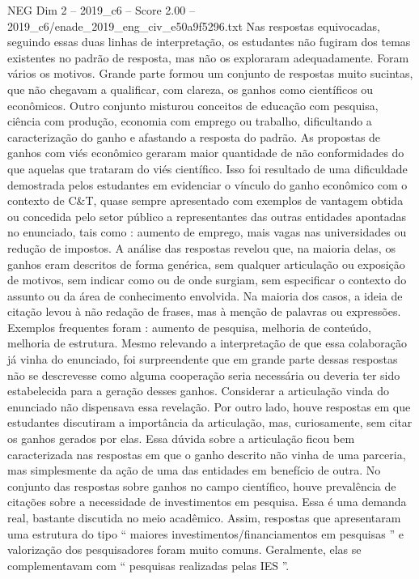 \begin{textsample}{NEG Dim 2 – 2019\_c6 – Score 2.00 – 2019\_c6/enade\_2019\_eng\_civ\_e50a9f5296.txt}
Nas respostas equivocadas, seguindo essas duas linhas de interpretação, os estudantes não fugiram dos temas existentes no padrão de resposta, mas não os exploraram adequadamente.
Foram vários os motivos.
Grande parte formou um conjunto de respostas muito sucintas, que não chegavam a qualificar, com clareza, os ganhos como científicos ou econômicos.
Outro conjunto misturou conceitos de educação com pesquisa, ciência com produção, economia com emprego ou trabalho, dificultando a caracterização do ganho e afastando a resposta do padrão.
As propostas de ganhos com viés econômico geraram maior quantidade de não conformidades do que aquelas que trataram do viés científico.
Isso foi resultado de uma dificuldade demostrada pelos estudantes em evidenciar o vínculo do ganho econômico com o contexto de C\&T, quase sempre apresentado com exemplos de vantagem obtida ou concedida pelo setor público a representantes das outras entidades apontadas no enunciado, tais como : aumento de emprego, mais vagas nas universidades ou redução de impostos.
A análise das respostas revelou que, na maioria delas, os ganhos eram descritos de forma genérica, sem qualquer articulação ou exposição de motivos, sem indicar como ou de onde surgiam, sem especificar o contexto do assunto ou da área de conhecimento envolvida.
Na maioria dos casos, a ideia de citação levou à não redação de frases, mas à menção de palavras ou expressões.
Exemplos frequentes foram : aumento de pesquisa, melhoria de conteúdo, melhoria de estrutura.
Mesmo relevando a interpretação de que essa colaboração já vinha do enunciado, foi surpreendente que em grande parte dessas respostas não se descrevesse como alguma cooperação seria necessária ou deveria ter sido estabelecida para a geração desses ganhos.
Considerar a articulação vinda do enunciado não dispensava essa revelação.
Por outro lado, houve respostas em que estudantes discutiram a importância da articulação, mas, curiosamente, sem citar os ganhos gerados por elas.
Essa dúvida sobre a articulação ficou bem caracterizada nas respostas em que o ganho descrito não vinha de uma parceria, mas simplesmente da ação de uma das entidades em benefício de outra.
No conjunto das respostas sobre ganhos no campo científico, houve prevalência de citações sobre a necessidade de investimentos em pesquisa.
Essa é uma demanda real, bastante discutida no meio acadêmico.
Assim, respostas que apresentaram uma estrutura do tipo “ maiores investimentos/financiamentos em pesquisas ” e valorização dos pesquisadores foram muito comuns.
Geralmente, elas se complementavam com “ pesquisas realizadas pelas IES ”.

\end{textsample}
